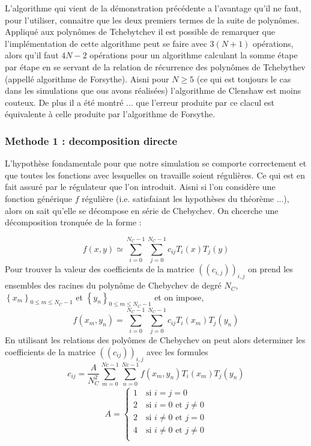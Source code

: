 \documentclass[10pt]{article}
\begin{document}
\begin{multicols}{2}
L'algorithme qui vient de la démonstration précédente a l'avantage qu'il ne faut, pour l'utiliser, connaitre que les deux premiers termes de la suite de polynômes. Appliqué aux polynômes de Tchebytchev il est possible de remarquer que l'implémentation de cette algorithme peut se faire avec $3(N +1)$ opérations, alors qu'il faut $4N-2$ opérations pour un algorithme calculant la somme étape par étape en se servant de la relation de récurrence des polynômes de Tchebythev (appellé algorithme de Forsythe). Aisni pour $N \ge 5$ (ce qui est toujours le cas dans les simulations que ous avons réalisées) l'algorithme de Clenshaw est moins couteux. De plus il a été montré ... que l'erreur produite par ce clacul est équivalente à celle produite par l'algorithme de Forsythe. 



\subsubsection{Methode 1 : decomposition directe}

L'hypothèse fondamentale pour que notre simulation se comporte correctement et que toutes les fonctions avec lesquelles on travaille soient régulières. Ce qui est en fait assuré par le régulateur que l'on introduit. Aisni si l'on considère une fonction générique $f$ régulière (i.e. satisfaiant les hypothèses du théorème ...), alors on sait qu'elle se décompose en série de Chebychev. On chcerche une décomposition tronquée de la forme :

\begin{equation}
  f(x,y) \simeq \sum_{i=0}^{N_C-1}\sum_{j=0}^{N_C-1} c_{ij} T_i(x)T_j(y)
\end{equation}
Pour trouver la valeur des coefficients de la matrice $((c_{i,j}))_{i,j}$ on prend les ensembles des racines du polynôme de Chebychev  de degré $N_C$, $\left\{x_m\right\}_{0\le m \le N_C-1}$ et $\left\{y_n\right\}_{0\le m \le N_C-1}$ et on impose,
\begin{equation}
  f(x_m, y_n) = \sum_{i=0}^{N_C-1}\sum_{j=0}^{N_C-1} c_{ij} T_i(x_m)T_j(y_n)
\end{equation}
En utilisant les relations des polyômes de Chebychev on peut alors determiner les coefficients de la matrice $((c_{ij}))_{i,j}$ avec les formules
\begin{equation}
 c_{ij} = \frac{A}{N_C^2} \sum_{m=0}^{Nc-1} \sum_{n=0}^{Nc-1} f(x_m, y_n)T_i(x_m)T_j(y_n)
\end{equation}
\begin{align}
  A = 
  \begin{cases}
    1 \quad \text{si } i = j = 0 \\
    2 \quad \text{si } i = 0 \text{ et } j \neq 0 \\
    2 \quad \text{si } i \neq 0 \text{ et } j = 0 \\
    4 \quad \text{si } i \neq 0 \text{ et } j \neq 0 \\
  \end{cases}
\end{align}


\end{multicols}
\end{document}
